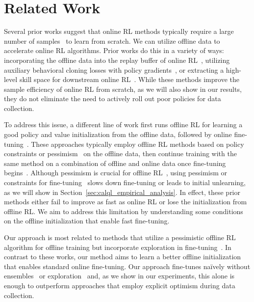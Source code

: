 \vspace{-0.2cm}
\section{Related Work}
\vspace{-0.3cm}
Several prior works suggest that online RL methods typically require a large number of samples~\cite{silver2016mastering,vinyals2019grandmaster,ye2020towards,kakade2002approximately,zhai2022computational,gupta2022unpacking,li2022understanding} to learn from scratch. We can utilize offline data to accelerate online RL algorithms. Prior works do this in a variety of ways: incorporating the offline data into the replay buffer of online RL~\cite{schaal1996learning,vecerik2017leveraging,hester2018deep,song2023hybrid}, utilizing auxiliary behavioral cloning losses with policy gradients~\cite{rajeswaran2017learning,kang2018policy,zhu2018reinforcement,zhu2019dexterous}, or extracting a high-level skill space for downstream online RL~\cite{gupta2019relay,ajay2020opal}. While these methods improve the sample efficiency of online RL from scratch, as we will also show in our results, they do not eliminate the need to actively roll out poor policies for data collection.

To address this issue, a different line of work first runs offline RL for learning a good policy and value initialization from the offline data, followed by online fine-tuning~\cite{nair2020accelerating,kostrikov2021iql,lyu2022mildly,beeson2022improving,wu2022supported,lee2022offline,mark2022fine}. These approaches typically employ offline RL methods based on policy constraints or pessimism~\cite{fujimoto2018off,siegel2020keep,guo2020batch,ghasemipour2021emaq,kostrikov2021iql,singh2020cog,lee2022offline} on the offline data, then continue training with the same method on a combination of offline and online data once fine-tuning begins~\cite{nachum2019algaedice,kidambi2020morel,yu2020mopo,kumar2020conservative,buckman2020importance}. Although pessimism is crucial for offline RL~\cite{jin2021pessimism,cheng2022adversarially}, using pessimism or constraints for fine-tuning~\cite{nair2020accelerating,kostrikov2021iql,lyu2022mildly} slows down fine-tuning or leads to initial unlearning, as we will show in Section~\ref{sec:calql_empirical_analysis}. In effect, these prior methods either fail to improve as fast as online RL or lose the initialization from offline RL. We aim to address this limitation by understanding some conditions on the offline initialization that enable fast fine-tuning. 

Our approach is most related to methods that utilize a pessimistic offline RL algorithm for offline training but incorporate exploration in fine-tuning~\cite{lee2022offline,mark2022fine,wu2022supported}. In contrast to these works, our method aims to learn a better offline initialization that enables standard online fine-tuning. Our approach fine-tunes na\"ively without ensembles~\cite{lee2022offline} or exploration~\cite{mark2022fine} and, as we show in our experiments, this alone is enough to outperform approaches that employ explicit optimism during data collection.